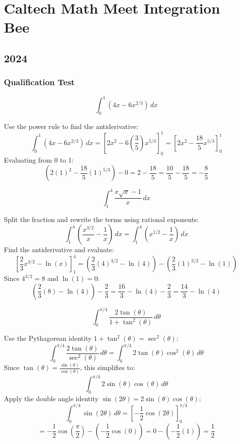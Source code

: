 \pagebreak
\section{Caltech Math Meet Integration Bee}
\subsection*{2024}
\subsubsection*{Qualification Test}
\begin{questions}
    \question \[ \int_{0}^{1}(4x-6x^{2/3}) \,dx \]
    \begin{solution}
        Use the power rule to find the antiderivative:
        \[ \int_{0}^{1}(4x-6x^{2/3}) \,dx = \left[ 2x^2 - 6 \left(\frac{3}{5}\right)x^{5/3} \right]_0^1 = \left[ 2x^2 - \frac{18}{5}x^{5/3} \right]_0^1 \]
        Evaluating from 0 to 1:
        \[ \left( 2(1)^2 - \frac{18}{5}(1)^{5/3} \right) - 0 = 2 - \frac{18}{5} = \frac{10}{5} - \frac{18}{5} = -\frac{8}{5} \]
    \end{solution}

    \question \[ \int_{1}^{4}\frac{x\sqrt{x}-1}{x} \,dx \]
    \begin{solution}
        Split the fraction and rewrite the terms using rational exponents:
        \[ \int_{1}^{4} \left( \frac{x^{3/2}}{x} - \frac{1}{x} \right) \,dx = \int_{1}^{4} \left( x^{1/2} - \frac{1}{x} \right) \,dx \]
        Find the antiderivative and evaluate:
        \[ \left[ \frac{2}{3}x^{3/2} - \ln(x) \right]_1^4 = \left( \frac{2}{3}(4)^{3/2} - \ln(4) \right) - \left( \frac{2}{3}(1)^{3/2} - \ln(1) \right) \]
        Since $4^{3/2} = 8$ and $\ln(1) = 0$:
        \[ \left( \frac{2}{3}(8) - \ln(4) \right) - \frac{2}{3} = \frac{16}{3} - \ln(4) - \frac{2}{3} = \frac{14}{3} - \ln(4) \]
    \end{solution}

    \question \[ \int_{0}^{\pi/4}\frac{2\tan(\theta)}{1+\tan^{2}(\theta)} \,d\theta \]
    \begin{solution}
        Use the Pythagorean identity $1 + \tan^2(\theta) = \sec^2(\theta)$:
        \[ \int_{0}^{\pi/4} \frac{2\tan(\theta)}{\sec^2(\theta)} \,d\theta = \int_{0}^{\pi/4} 2\tan(\theta)\cos^2(\theta) \,d\theta \]
        Since $\tan(\theta) = \frac{\sin(\theta)}{\cos(\theta)}$, this simplifies to:
        \[ \int_{0}^{\pi/4} 2\sin(\theta)\cos(\theta) \,d\theta \]
        Apply the double angle identity $\sin(2\theta) = 2\sin(\theta)\cos(\theta)$:
        \[ \int_{0}^{\pi/4} \sin(2\theta) \,d\theta = \left[ -\frac{1}{2}\cos(2\theta) \right]_0^{\pi/4} \]
        \[ = -\frac{1}{2}\cos\left(\frac{\pi}{2}\right) - \left(-\frac{1}{2}\cos(0)\right) = 0 - \left(-\frac{1}{2}(1)\right) = \frac{1}{2} \]
    \end{solution}


\end{questions}
